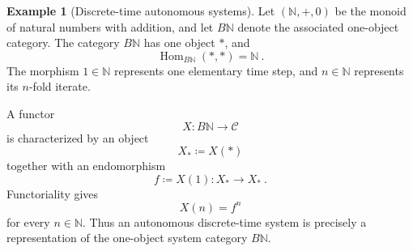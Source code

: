 \documentclass[a4paper,reqno,oneside]{amsart}
\theoremstyle{definition}
\newtheorem{example}[theorem]{Example}
\theoremstyle{remark}
\newcommand{\N}{\mathbb{N}}
\numberwithin{equation}{section}
\begin{document}
	\begin{example}[Discrete-time autonomous systems]\label{ex: Discrete-time autonomous systems}
		Let $(\N,+,0)$ be the monoid of natural numbers with addition, and let
		$B\N$ denote the associated one-object category. The category $B\N$ has one
		object $*$, and
		\begin{equation}
			\operatorname{Hom}_{B\N}(*,*)=\N \ .
		\end{equation}
		The morphism $1\in\N$ represents one elementary time step, and $n\in\N$
		represents its $n$-fold iterate.
		
		A functor
		\begin{equation}
			X\colon B\N\to\mathcal C
		\end{equation}
		is characterized by an object
		\begin{equation}
			X_*\coloneqq X(*)
		\end{equation}
		together with an endomorphism
		\begin{equation}
			f\coloneqq X(1)\colon X_*\longrightarrow X_* \ .
		\end{equation}
		Functoriality gives
		\begin{equation}
			X(n)=f^n
		\end{equation}
		for every $n\in\N$. Thus an autonomous discrete-time system is precisely a
		representation of the one-object system category $B\N$.
	\end{example}
	
\end{document}
